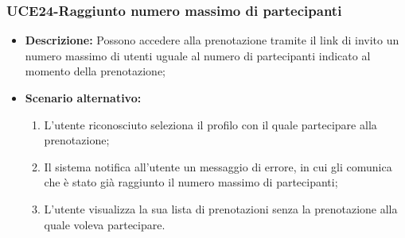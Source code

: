 \subsubsection{UCE24-Raggiunto numero massimo di partecipanti}
\begin{itemize}
    \item \textbf{Descrizione:} Possono accedere alla prenotazione tramite il link di invito un numero massimo di utenti uguale al numero di partecipanti indicato al momento della prenotazione;
    \item \textbf{Scenario alternativo:}
    \begin{enumerate}
        \item L'utente riconosciuto seleziona il profilo con il quale partecipare alla prenotazione;
        \item Il sistema notifica all'utente un messaggio di errore, in cui gli comunica che è stato già raggiunto il numero massimo di partecipanti; %
        \item L'utente visualizza la sua lista di prenotazioni senza la prenotazione alla quale voleva partecipare.
    \end{enumerate}
\end{itemize}

